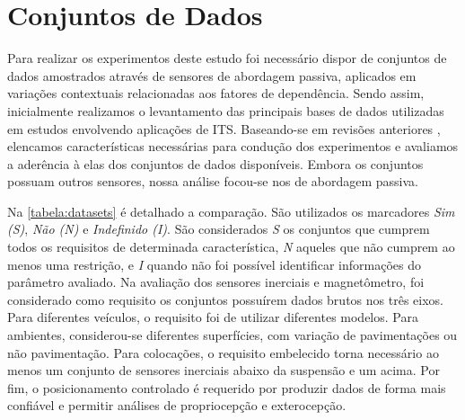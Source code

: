 \chapter{Conjuntos de Dados}
\label{cap:conjuntos_de_dados}

Para realizar os experimentos deste estudo foi necessário dispor de conjuntos de dados amostrados através de sensores de abordagem passiva, aplicados em variações contextuais relacionadas aos fatores de dependência. Sendo assim, inicialmente realizamos o levantamento das principais bases de dados utilizadas em estudos envolvendo aplicações de ITS. Baseando-se em revisões anteriores \cite{Geyer2020}, elencamos características necessárias para condução dos experimentos e avaliamos a aderência à elas dos conjuntos de dados disponíveis. Embora os conjuntos possuam outros sensores, nossa análise focou-se nos de abordagem passiva.

Na \autoref{tabela:datasets} é detalhado a comparação. São utilizados os marcadores \emph{Sim (S)}, \emph{Não (N)} e \emph{Indefinido (I)}. São considerados \emph{S} os conjuntos que cumprem todos os requisitos de determinada característica, \emph{N} aqueles que não cumprem ao menos uma restrição, e \emph{I} quando não foi possível identificar informações do parâmetro avaliado. Na avaliação dos sensores inerciais e magnetômetro, foi considerado como requisito os conjuntos possuírem dados brutos nos três eixos. Para diferentes veículos, o requisito foi de utilizar diferentes modelos. Para ambientes, considerou-se diferentes superfícies, com variação de pavimentações ou não pavimentação. Para colocações, o requisito embelecido torna necessário ao menos um conjunto de sensores inerciais abaixo da suspensão e um acima. Por fim, o posicionamento controlado é requerido por produzir dados de forma mais confiável e permitir análises de propriocepção e exterocepção.

